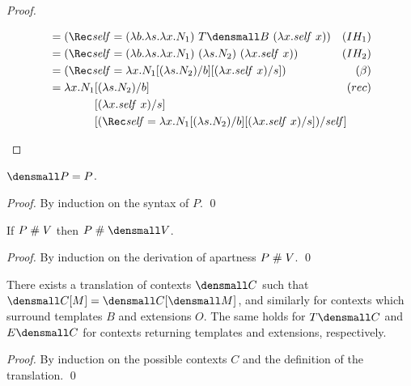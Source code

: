 \begin{proof}
\begin{enumerate}[(a)]
\begin{itemize}
\begin{align*}
        &=
        (\Rec \mathit{self}
        = (\lambda b. \lambda s. \lambda x. N_1)
        ~ T\den{B}
        ~ (\lambda x. \mathit{self} ~ x))
        &(IH_1)
        \\
        &=
        (\Rec \mathit{self}
        = (\lambda b. \lambda s. \lambda x. N_1)
        ~ (\lambda s. N_2)
        ~ (\lambda x. \mathit{self} ~ x))
        &(IH_2)
        \\
        &=
        (\Rec \mathit{self}
        = \lambda x.N_1\subst{b}{(\lambda s.N_2)}\subst{s}{(\lambda x.\mathit{self}~x)})
        &(\beta)
        \\
        &=
        \begin{aligned}[t]
          \lambda x.
          N_1
          &\subst{b}{(\lambda s.N_2)}
          \\
          &\subst{s}{(\lambda x.\mathit{self}~x)}
          \\
          &\rlap
          {$
            \subst
            {\mathit{self}}
            {
              (\Rec \mathit{self}
              =
              \lambda x.N_1\subst{b}{(\lambda s.N_2)}\subst{s}{(\lambda x.\mathit{self}~x)})
            }
          $}
        \end{aligned}
        &(rec)
      \end{align*}
    \end{itemize}
  \end{enumerate}
\end{proof}

\begin{lemma}
  \label{thm:pattern-translation}

  $\den{P} = P$.
\end{lemma}
\begin{proof}
  By induction on the syntax of $P$.
  \qed
\end{proof}

\begin{lemma}
  \label{thm:apartness-translation}

  If $P \mathrel{\#} V$ then $P \apart \den{V}$.
\end{lemma}
\begin{proof}
  By induction on the derivation of apartness $P \mathrel{\#} V$.
  \qed
\end{proof}

\begin{lemma}[Compositionality]
  \label{thm:compositional-translation}

  There exists a translation of contexts $\den{C}$ such that $\den{C[M]} = \den{C}{[\den{M}]}$, and similarly for contexts which surround templates $B$ and extensions $O$.
  The same holds for $T\den{C}$ and $E\den{C}$ for contexts returning templates and extensions, respectively.
\end{lemma}
\begin{proof}
  By induction on the possible contexts $C$ and the definition of the translation.
  \qed
\end{proof}


